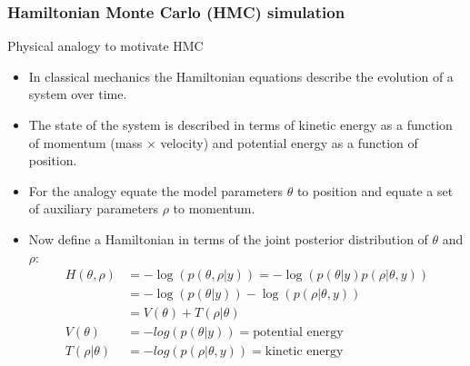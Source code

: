 \documentclass{beamer}
\begin{document}
\begin{frame}[shrink]
  \frametitle{Hamiltonian Monte Carlo (HMC) simulation}
  
  Physical analogy to motivate HMC
  \begin{itemize}
  \item In classical mechanics the Hamiltonian equations describe the
    evolution of a system over time.
  \item The state of the system is described in terms of kinetic
    energy as a function of momentum (mass $\times$ velocity) and
    potential energy as a function of position.
  \item For the analogy equate the model parameters $\theta$ to
    position and equate a set of auxiliary parameters $\rho$ to
    momentum.
  \item Now define a Hamiltonian in terms of the joint posterior
    distribution of $\theta$ and $\rho$:
    \begin{align*}
      H(\theta, \rho) &= -\log\left(p\left(\theta, \rho | y\right)\right) 
                      = -\log\left(p\left(\theta | y\right)
                        p\left(\rho | \theta, y\right)\right) \\
                      &= -\log\left(p\left(\theta | y\right)\right)
                        - \log\left(p\left(\rho | \theta,
                        y\right)\right) \\
                      &= V\left(\theta\right) + T\left(\rho |
                        \theta\right) \\
      V\left(\theta\right) &= -log\left(p\left(\theta | y\right)\right)
                             = \text{potential energy} \\
      T\left(\rho | \theta\right) &= - log\left(p\left(\rho | \theta,  y\right)\right) = \text{kinetic energy}
    \end{align*}
  \end{itemize}

\end{frame}
\end{document}

